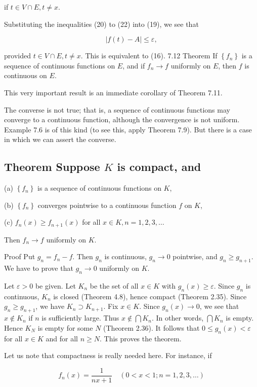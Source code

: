 \documentclass[10pt]{article}
\begin{document}
if $t \in V \cap E, t \neq x$.

Substituting the inequalities (20) to (22) into (19), we see that

$$
|f(t)-A| \leq \varepsilon,
$$

provided $t \in V \cap E, t \neq x$. This is equivalent to (16). 7.12 Theorem If $\left\{f_{n}\right\}$ is a sequence of continuous functions on $E$, and if $f_{n} \rightarrow f$ uniformly on $E$, then $f$ is continuous on $E$.

This very important result is an immediate corollary of Theorem 7.11.

The converse is not true; that is, a sequence of continuous functions may converge to a continuous function, although the convergence is not uniform. Example 7.6 is of this kind (to see this, apply Theorem 7.9). But there is a case in which we can assert the converse.

\subsection{Theorem Suppose $K$ is compact, and}
(a) $\left\{f_{n}\right\}$ is a sequence of continuous functions on $K$,

(b) $\left\{f_{n}\right\}$ converges pointwise to a continuous function $f$ on $K$,

(c) $f_{n}(x) \geq f_{n+1}(x)$ for all $x \in K, n=1,2,3, \ldots$

Then $f_{n} \rightarrow f$ uniformly on $K$.

Proof Put $g_{n}=f_{n}-f$. Then $g_{n}$ is continuous, $g_{n} \rightarrow 0$ pointwise, and $g_{n} \geq g_{n+1}$. We have to prove that $g_{n} \rightarrow 0$ uniformly on $K$.

Let $\varepsilon>0$ be given. Let $K_{n}$ be the set of all $x \in K$ with $g_{n}(x) \geq \varepsilon$. Since $g_{n}$ is continuous, $K_{n}$ is closed (Theorem 4.8), hence compact (Theorem 2.35). Since $g_{n} \geq g_{n+1}$, we have $K_{n} \supset K_{n+1}$. Fix $x \in K$. Since $g_{n}(x) \rightarrow 0$, we see that $x \notin K_{n}$ if $n$ is sufficiently large. Thus $x \notin \bigcap K_{n}$. In other words, $\bigcap K_{n}$ is empty. Hence $K_{N}$ is empty for some $N$ (Theorem 2.36). It follows that $0 \leq g_{n}(x)<\varepsilon$ for all $x \in K$ and for all $n \geq N$. This proves the theorem.

Let us note that compactness is really needed here. For instance, if

$$
f_{n}(x)=\frac{1}{n x+1} \quad(0<x<1 ; n=1,2,3, \ldots)
$$
\end{document}
